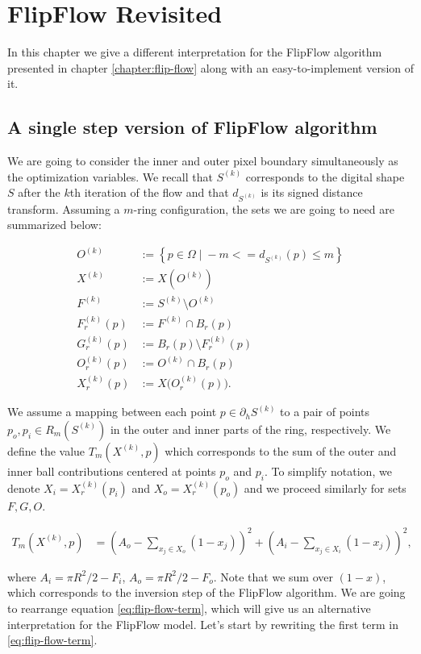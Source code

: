 \chapter{FlipFlow Revisited}
\label{chapter:flip-flow-revisited}

In this chapter we give a different interpretation for the FlipFlow algorithm presented in chapter \ref{chapter:flip-flow} along with an easy-to-implement version of it.

\section{A single step version of FlipFlow algorithm}
We are going to consider the inner and outer pixel boundary simultaneously as the optimization variables. We recall that $S^{(k)}$ corresponds to the digital shape $S$ after the $k$th iteration of the flow and that $d_{S^{(k)}}$ is its signed distance transform. Assuming a $m$-ring configuration, the sets we are going to need are summarized below:

\begin{align*}
	O^{(k)} &:=\left\{ p \in \Omega \; | \; -m <= d_{S^{(k)}}(p) \leq m \right\}\\
	X^{(k)} &:= X(O^{(k)})  \\
	F^{(k)} &:= S^{(k)} \setminus O^{(k)} \\
	F_r^{(k)}(p) &:= F^{(k)} \cap B_r(p)\\
	G_r^{(k)}(p) &:= B_r(p) \setminus F_r^{(k)}(p) \\	
	O_r^{(k)}(p) &:= O^{(k)} \cap B_r(p) \\
	X_r^{(k)}(p) &:= X\big( O_r^{(k)}(p) \big).
\end{align*}

We assume a mapping between each point $p \in \partial_h S^{(k)}$ to a pair of points $p_o,p_i \in R_m(S^{(k)})$ in the outer and inner parts of the ring, respectively. We define the value $T_m(X^{(k)},p)$ which corresponds to the sum of the outer and inner ball contributions centered at points $p_o$ and $p_i$. To simplify notation, we denote $X_i=X_r^{(k)}(p_i)$ and $X_o=X_r^{(k)}(p_o)$ and we proceed similarly for sets $F,G,O$.

\begin{align}
	T_m(X^{(k)},p) &= (A_o - \sum_{x_j \in X_o}{(1-x_j)})^2  + (A_i - \sum_{x_j \in X_i}{(1-x_j)})^2 
	\label{eq:flip-flow-term},
\end{align}

where $A_i=\pi R^2/2 - F_i$, $A_o=\pi R^2/2 - F_o$. Note that we sum over $(1-x)$, which corresponds to the inversion step of the FlipFlow algorithm. We are going to rearrange equation \eqref{eq:flip-flow-term}, which will give us an alternative interpretation for the FlipFlow model. Let's start by rewriting the first term in \eqref{eq:flip-flow-term}.

